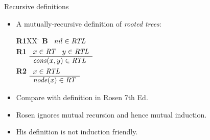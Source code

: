 \begin{wideslide}[bm=,toc=]{Recursive definitions}
\begin{itemize}
\item A mutually-recursive definition of {\em rooted trees\/}:
\vspace{-1em}
\begin{tabbing}
{\bf R1}XX \=  \kill
{\bf B} \>
        \(\begin{array}[t]{l}
        \mbox{\it nil\/}\in\mbox{\it RTL\/}
        \end{array}\) \\[2ex]
{\bf R1} \>
        \(\begin{array}[t]{l}
        x\in\mbox{\it RT\/}\;\;\;y\in\mbox{\it RTL\/} \\
        \hline
        \mbox{\it cons\/}(x,y)\in\mbox{\it RTL\/}
        \end{array}\) \\[2ex]
{\bf R2} \>
        \(\begin{array}[t]{l}
        x\in\mbox{\it RTL\/} \\
        \hline
        \mbox{\it node\/}(x)\in\mbox{\it RT\/}
        \end{array}\)
\end{tabbing}
\item Compare with definition in Rosen 7th Ed.
\item Rosen ignores mutual recursion and hence mutual induction.
\item His definition is not induction friendly.
\end{itemize}
\end{wideslide}

